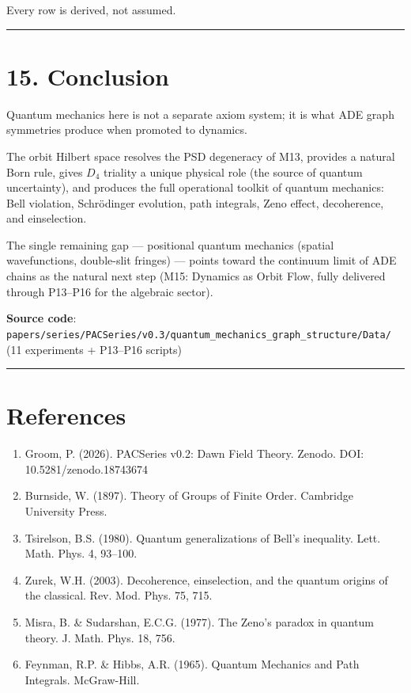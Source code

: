 \documentclass[11pt,a4paper]{article}
\providecommand{\tightlist}{\setlength{\itemsep}{0pt}\setlength{\parskip}{0pt}}
\begin{document}
Every row is derived, not assumed.

\begin{center}\rule{0.5\linewidth}{0.4pt}\end{center}

\section*{15. Conclusion}

Quantum mechanics here is not a separate axiom system; it is what ADE graph symmetries produce when promoted to dynamics.

The orbit Hilbert space resolves the PSD degeneracy of M13, provides a natural Born rule, gives $D_4$ triality a unique physical role (the source of quantum uncertainty), and produces the full operational toolkit of quantum mechanics: Bell violation, Schrödinger evolution, path integrals, Zeno effect, decoherence, and einselection.

The single remaining gap — positional quantum mechanics (spatial wavefunctions, double-slit fringes) — points toward the continuum limit of ADE chains as the natural next step (M15: Dynamics as Orbit Flow, fully delivered through P13–P16 for the algebraic sector).

\textbf{Source code}: \texttt{papers/series/PACSeries/v0.3/quantum_mechanics_graph_structure/Data/} (11 experiments + P13–P16 scripts)

\begin{center}\rule{0.5\linewidth}{0.4pt}\end{center}

\section*{References}

\begin{enumerate}\tightlist
\item Groom, P. (2026). PACSeries v0.2: Dawn Field Theory. Zenodo. DOI: 10.5281/zenodo.18743674
\item Burnside, W. (1897). Theory of Groups of Finite Order. Cambridge University Press.
\item Tsirelson, B.S. (1980). Quantum generalizations of Bell's inequality. Lett. Math. Phys. 4, 93–100.
\item Zurek, W.H. (2003). Decoherence, einselection, and the quantum origins of the classical. Rev. Mod. Phys. 75, 715.
\item Misra, B. \& Sudarshan, E.C.G. (1977). The Zeno's paradox in quantum theory. J. Math. Phys. 18, 756.
\item Feynman, R.P. \& Hibbs, A.R. (1965). Quantum Mechanics and Path Integrals. McGraw-Hill.
\end{enumerate}
\end{document}
